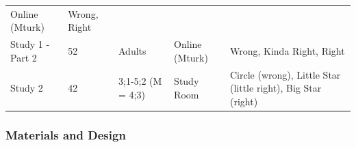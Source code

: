\documentclass[oneside]{report}
\theoremstyle{definition}
\theoremstyle{definition}
\theoremstyle{definition}
\theoremstyle{remark}
\begin{document}
\begin{longtable}[]{@{}lllll@{}}
\begin{minipage}[t]{0.15\columnwidth}
Online (Mturk)\strut
\end{minipage} & \begin{minipage}[t]{0.31\columnwidth}\raggedright\strut
Wrong, Right\strut
\end{minipage}\tabularnewline
\begin{minipage}[t]{0.17\columnwidth}\raggedright\strut
Study 1 - Part 2\strut
\end{minipage} & \begin{minipage}[t]{0.08\columnwidth}\raggedright\strut
52\strut
\end{minipage} & \begin{minipage}[t]{0.16\columnwidth}\raggedright\strut
Adults\strut
\end{minipage} & \begin{minipage}[t]{0.15\columnwidth}\raggedright\strut
Online (Mturk)\strut
\end{minipage} & \begin{minipage}[t]{0.31\columnwidth}\raggedright\strut
Wrong, Kinda Right, Right\strut
\end{minipage}\tabularnewline
\begin{minipage}[t]{0.17\columnwidth}\raggedright\strut
Study 2\strut
\end{minipage} & \begin{minipage}[t]{0.08\columnwidth}\raggedright\strut
42\strut
\end{minipage} & \begin{minipage}[t]{0.16\columnwidth}\raggedright\strut
3;1-5;2 (M = 4;3)\strut
\end{minipage} & \begin{minipage}[t]{0.15\columnwidth}\raggedright\strut
Study Room\strut
\end{minipage} & \begin{minipage}[t]{0.31\columnwidth}\raggedright\strut
Circle (wrong), Little Star (little right), Big Star (right)\strut
\end{minipage}\tabularnewline
\bottomrule
\end{longtable}
\subsubsection{Materials and Design}\label{materials-and-design-1}
\end{document}
